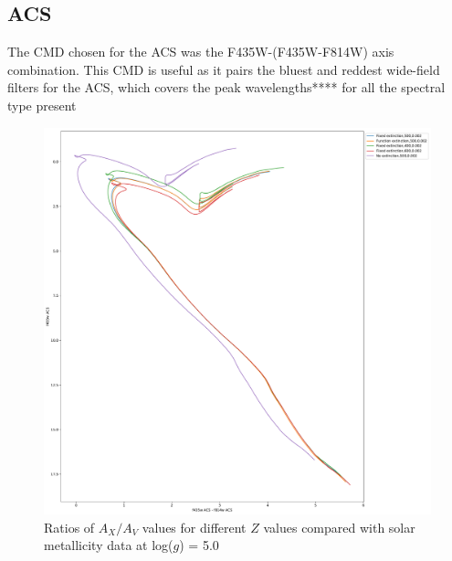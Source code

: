 \documentclass[12pt, a4paper]{report}
\begin{document}
\subsection{ACS} \label{ACS_isoc}

The CMD chosen for the ACS was the F435W-(F435W-F814W) axis combination. This CMD is useful as it pairs the bluest and reddest wide-field filters for the ACS, which covers the peak wavelengths**** for all the spectral type present

\begin{figure}[h]
\begin{center}
\includegraphics[scale=0.3]{../basti_isochrones_10_13Gyr/Extinction_T5k_FeH0fix_func_f435wACS_f435wACSmf814wACS_500_400_600_Myr_FeH_0p002_ref_noext_Av_1p0.pdf}
\caption{Ratios of $A_{X}/A_{V}$ values for different $Z$ values compared with solar metallicity data at log($g$) = 5.0}
\label{acs_isoc_T5k}
\end{center}
\end{figure}
\end{document}

